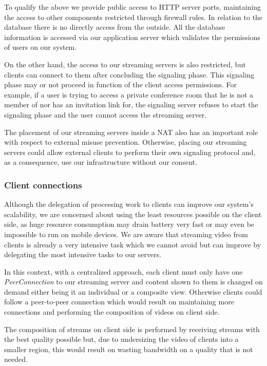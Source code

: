 \documentclass[10pt,conference]{IEEEtran}
\begin{document}
To qualify the above we provide public access to \gls{HTTP} server ports, maintaining the access to other components restricted through firewall rules.
In relation to the database there is no directly access from the outside. All the database information is accessed via our application server which validates the permissions of users on our system.

On the other hand, the access to our streaming servers is also restricted, but clients can connect to them after concluding the signaling phase. This signaling phase may or not proceed in function of the client access permissions. For example, if a user is trying to access a private conference room that he is not a member of nor has an invitation link for, the signaling server refuses to start the signaling phase and the user cannot access the streaming server.

The placement of our streaming servers inside a \gls{NAT} also has an important role with respect to external misuse prevention. Otherwise, placing our streaming servers could allow external clients to perform their own signaling protocol and, as a consequence, use our infrastructure without our consent.

\subsubsection{Client connections}
	Although the delegation of processing work to clients can improve our system's scalability, we are concerned about using the least resources possible on the client side, as huge resource consumption may drain battery very fast or may even be impossible to run on mobile devices. We are aware that streaming video from clients is already a very intensive task which we cannot avoid but can improve by delegating the most intensive tasks to our servers. 


	In this context, with a centralized approach, each client must only have one \emph{PeerConnection} to our streaming server and content shown to them is changed on demand either being it an individual or a composite view. Otherwise clients could follow a peer-to-peer connection which would result on maintaining more connections and performing the composition of videos on client side.

	The composition of streams on client side is performed by receiving streams with the best quality possible but, due to undersizing the video of clients into a smaller region, this would result on wasting bandwidth on a quality that is not needed.
\end{document}
